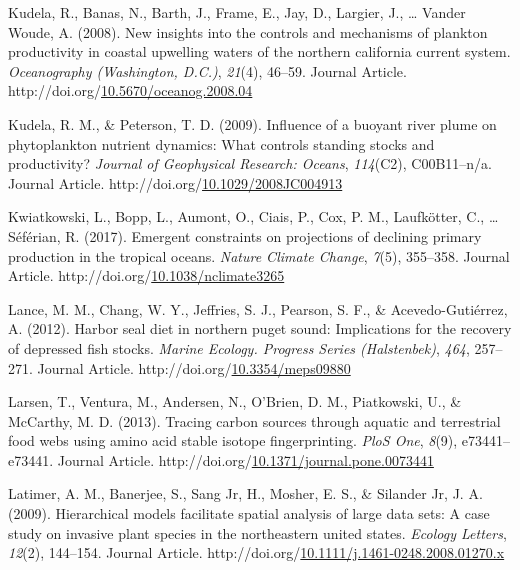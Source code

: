 \documentclass [11pt, proquest] {uwthesis}[2015/03/03]
\newlength{\cslhangindent}
\newenvironment{CSLReferences}%
{\setlength{\parindent}{0pt}%
\everypar{\setlength{\hangindent}{\cslhangindent}}\ignorespaces}%
{\par}
\begin{document}
\begin{CSLReferences}{1}{0}
\leavevmode\hypertarget{ref-Kudela2008}{}%
Kudela, R., Banas, N., Barth, J., Frame, E., Jay, D., Largier, J., \ldots{} Vander Woude, A. (2008). New insights into the controls and mechanisms of plankton productivity in coastal upwelling waters of the northern california current system. \emph{Oceanography (Washington, D.C.)}, \emph{21}(4), 46--59. Journal Article. http://doi.org/\href{https://doi.org/10.5670/oceanog.2008.04}{10.5670/oceanog.2008.04}

\leavevmode\hypertarget{ref-Kudela2009}{}%
Kudela, R. M., \& Peterson, T. D. (2009). Influence of a buoyant river plume on phytoplankton nutrient dynamics: What controls standing stocks and productivity? \emph{Journal of Geophysical Research: Oceans}, \emph{114}(C2), C00B11--n/a. Journal Article. http://doi.org/\href{https://doi.org/10.1029/2008JC004913}{10.1029/2008JC004913}

\leavevmode\hypertarget{ref-Kwiatkowski2017}{}%
Kwiatkowski, L., Bopp, L., Aumont, O., Ciais, P., Cox, P. M., Laufkötter, C., \ldots{} Séférian, R. (2017). Emergent constraints on projections of declining primary production in the tropical oceans. \emph{Nature Climate Change}, \emph{7}(5), 355--358. Journal Article. http://doi.org/\href{https://doi.org/10.1038/nclimate3265}{10.1038/nclimate3265}

\leavevmode\hypertarget{ref-Lance2012}{}%
Lance, M. M., Chang, W. Y., Jeffries, S. J., Pearson, S. F., \& Acevedo-Gutiérrez, A. (2012). Harbor seal diet in northern puget sound: Implications for the recovery of depressed fish stocks. \emph{Marine Ecology. Progress Series (Halstenbek)}, \emph{464}, 257--271. Journal Article. http://doi.org/\href{https://doi.org/10.3354/meps09880}{10.3354/meps09880}

\leavevmode\hypertarget{ref-Larsen2013}{}%
Larsen, T., Ventura, M., Andersen, N., O'Brien, D. M., Piatkowski, U., \& McCarthy, M. D. (2013). Tracing carbon sources through aquatic and terrestrial food webs using amino acid stable isotope fingerprinting. \emph{PloS One}, \emph{8}(9), e73441--e73441. Journal Article. http://doi.org/\href{https://doi.org/10.1371/journal.pone.0073441}{10.1371/journal.pone.0073441}

\leavevmode\hypertarget{ref-Latimer2009}{}%
Latimer, A. M., Banerjee, S., Sang Jr, H., Mosher, E. S., \& Silander Jr, J. A. (2009). Hierarchical models facilitate spatial analysis of large data sets: A case study on invasive plant species in the northeastern united states. \emph{Ecology Letters}, \emph{12}(2), 144--154. Journal Article. http://doi.org/\href{https://doi.org/10.1111/j.1461-0248.2008.01270.x}{10.1111/j.1461-0248.2008.01270.x}


\end{CSLReferences}
\end{document}
